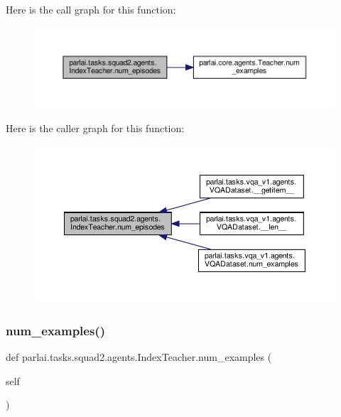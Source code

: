 Here is the call graph for this function\+:
\nopagebreak
\begin{figure}[H]
\begin{center}
\leavevmode
\includegraphics[width=350pt]{classparlai_1_1tasks_1_1squad2_1_1agents_1_1IndexTeacher_aabf2ad3a489d5b1547afa2aaac7b5b79_cgraph}
\end{center}
\end{figure}
Here is the caller graph for this function\+:
\nopagebreak
\begin{figure}[H]
\begin{center}
\leavevmode
\includegraphics[width=350pt]{classparlai_1_1tasks_1_1squad2_1_1agents_1_1IndexTeacher_aabf2ad3a489d5b1547afa2aaac7b5b79_icgraph}
\end{center}
\end{figure}
\mbox{\label{classparlai_1_1tasks_1_1squad2_1_1agents_1_1IndexTeacher_af85b15f1fe388fef825a5df688eac522}} 
\subsubsection{\texorpdfstring{num\+\_\+examples()}{num\_examples()}}
{\footnotesize\ttfamily def parlai.\+tasks.\+squad2.\+agents.\+Index\+Teacher.\+num\+\_\+examples (\begin{DoxyParamCaption}\item[{}]{self }\end{DoxyParamCaption})}



